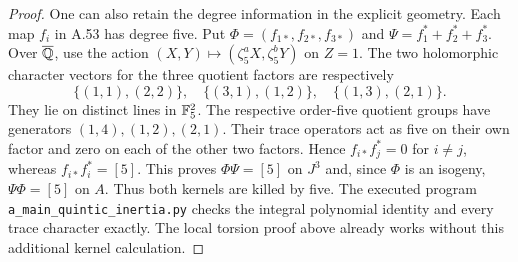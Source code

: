 \begin{proof}
One can also retain the degree information in the explicit geometry.
Each map $f_i$ in A.53 has degree five. Put
$\Phi=(f_{1*},f_{2*},f_{3*})$ and
$\Psi=f_1^*+f_2^*+f_3^*$.
Over $\overline{\mathbb Q}$, use the action
$(X,Y)\mapsto(\zeta_5^aX,\zeta_5^bY)$ on $Z=1$.
The two holomorphic character vectors for the three quotient factors
are respectively
\[
 \{(1,1),(2,2)\},\quad
 \{(3,1),(1,2)\},\quad
 \{(1,3),(2,1)\}.
\]
They lie on distinct lines in $\mathbb F_5^2$. The respective order-five
quotient groups have generators $(1,4),(1,2),(2,1)$.
Their trace operators act as five on their own factor and zero on
each of the other two factors. Hence
$f_{i*}f_j^*=0$ for $i\ne j$, whereas
$f_{i*}f_i^*=[5]$. This proves
$\Phi\Psi=[5]$ on $J^3$ and, since $\Phi$ is an isogeny,
$\Psi\Phi=[5]$ on $A$. Thus both kernels are killed by five.
The executed program \texttt{a\_main\_quintic\_inertia.py}
checks the integral polynomial identity and every trace character
exactly. The local torsion proof above already works without this
additional kernel calculation.
\end{proof}
